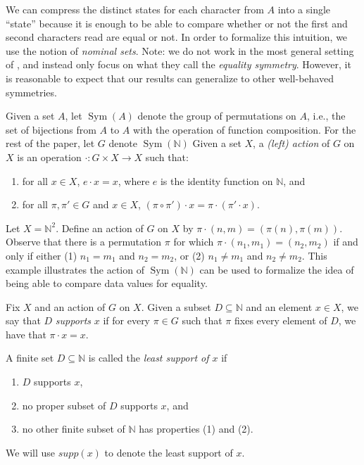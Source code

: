 \documentclass[runningheads]{llncs}
\newcommand{\bb}{\mathbb}
\DeclareMathOperator{\Sym}{Sym}
\begin{document}
We can compress the distinct states for each character from $A$ into a single ``state'' because it is enough to be able to compare whether or not the first and second characters read are equal or not.
In order to formalize this intuition, we use the notion of \emph{nominal sets}.
Note: we do not work in the most general setting of \cite{bojanczyk-klin-lasota:automata-theory-in-nominal-sets}, and instead only focus on what they call the \textit{equality symmetry}.
However, it is reasonable to expect that our results can generalize to other well-behaved symmetries.

Given a set $A$, let $\Sym(A)$ denote the group of permutations on $A$, i.e., the set of bijections from $A$ to $A$ with the operation of function composition.
For the rest of the paper, let $G$ denote $\Sym(\bb N)$
Given a set $X$, a \emph{(left) action} of $G$ on $X$ is an operation $\cdot : G \times X \to X$ such that:
\begin{enumerate}[1)]
    \item for all $x \in X$, $e \cdot x = x$, where $e$ is the identity function on $\bb N$, and 
    \item for all $\pi,\pi' \in G$ and $x \in X$, $(\pi \circ \pi') \cdot x = \pi \cdot (\pi' \cdot x)$.
\end{enumerate}

\begin{example} \label{eg:examples of group actions}
    Let $X = \bb N^2$. 
    Define an action of $G$ on $X$ by $\pi \cdot (n,m) = (\pi(n), \pi(m))$.
    Observe that there is a permutation $\pi$ for which $\pi \cdot (n_1, m_1) = (n_2, m_2)$ if and only if either (1) $n_1 = m_1$ and $n_2 = m_2$, or (2) $n_1 \neq m_1$ and $n_2 \neq m_2$. 
    This example illustrates the action of $\Sym(\bb N)$ can be used to formalize the idea of being able to compare data values for equality.
\end{example}

\begin{definition}
    Fix $X$ and an action of $G$ on $X$.
    Given a subset $D \subseteq \bb N$ and an element $x \in X$, we say that $D$ \emph{supports} $x$ if for every $\pi \in G$ such that $\pi$ fixes every element of $D$, we have that $\pi \cdot x = x$.

    A finite set $D \subseteq \bb N$ is called the \emph{least support of $x$} if 
    \begin{enumerate}[(1)]
        \item $D$ supports $x$, 
        \item no proper subset of $D$ supports $x$, and 
        \item no other finite subset of $\bb N$ has properties (1) and (2).
    \end{enumerate}
    We will use $supp(x)$ to denote the least support of $x$.
\end{definition}
\end{document}
